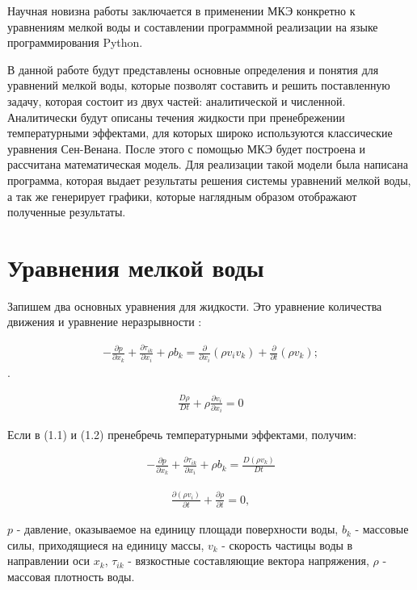 \documentclass[14pt]{extreport}
\begin{document}
Научная новизна работы заключается в применении МКЭ конкретно к уравнениям мелкой воды и составлении программной реализации на языке программирования Python.

В данной работе будут представлены основные определения и понятия для уравнений мелкой воды, которые позволят составить и решить поставленную задачу, которая состоит из двух частей: аналитической и численной. Аналитически будут описаны течения жидкости при пренебрежении температурными эффектами, для которых широко используются классические уравнения Сен-Венана. После этого с помощью МКЭ будет построена и рассчитана математическая модель. Для реализации такой модели была написана программа, которая выдает результаты решения системы уравнений мелкой воды, а так же генерирует графики, которые наглядным образом отображают полученные результаты.

\chapter{Уравнения мелкой воды}

Запишем два основных уравнения для жидкости. Это уравнение количества движения и уравнение неразрывности \cite{Konor:1979:FEM}:

\begin{gather}
-\frac{\partial p}{\partial x_k} + \frac{\partial \tau_{ik}}{\partial x_i} + \rho b_k = \frac{\partial}{\partial x_i}(\rho v_i v_k) + \frac{\partial}{\partial t}(\rho v_k);
\end{gather}.

\begin{gather}
\frac{D\rho}{Dt}+\rho \frac{\partial v_i}{\partial x_i} =0
\end{gather}

Если в (1.1) и (1.2) пренебречь температурными эффектами, получим:

\begin{gather}-\frac{\partial p}{\partial x_k} + \frac{\partial \tau_{ik}}{\partial x_i} + \rho b_k = \frac{D(\rho v_k)}{Dt}
\end{gather}

\begin{gather}\frac{\partial (\rho v_i)}{\partial t} + \frac{\partial \rho}{\partial t}=0,
\end{gather}

 $ p $ - давление, оказываемое на единицу площади поверхности воды, $ b_k $ - массовые силы, приходящиеся на единицу массы, $v_k$ - скорость частицы воды в направлении оси $x_k$, $\tau_{ik}$ - вязкостные составляющие вектора напряжения, $ \rho $ - массовая плотность воды.
\end{document}
